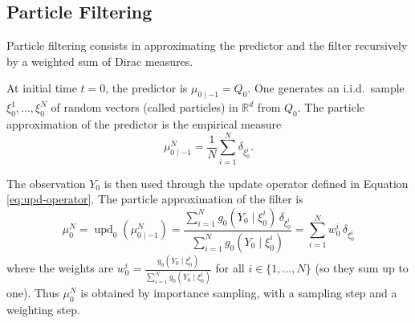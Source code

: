\documentclass{article}
\newcommand{\R}{\mathbb R}
\DeclareMathOperator{\upd}{upd}
\begin{document}
\subsection{Particle Filtering}

Particle filtering consists in approximating the predictor and the filter recursively by a weighted sum of Dirac measures.

At initial time $t=0$, the predictor is $\mu_{0 \mid -1} = Q_0$. One generates an i.i.d.\ sample $\xi^1_0,\dots,\xi^N_0$ of random vectors (called particles) in $\R^d$ from $Q_0$. The particle approximation of the predictor is the empirical measure
\begin{equation*}
    \mu^N_{0 \mid -1} = \frac 1N \sum_{i=1}^N \delta_{\xi^i_0}.
\end{equation*}

The observation $Y_0$ is then used through the update operator defined in Equation \eqref{eq:upd-operator}. The particle approximation of the filter is
\begin{equation*}
    \mu^N_0 = \upd_0(\mu^N_{0 \mid -1}) = \frac{\sum_{i=1}^N g_0(Y_0 \mid \xi^i_0) \, \delta_{\xi^i_0}}{\sum_{i=1}^N g_0(Y_0 \mid \xi^i_0)} = \sum_{i=1}^N w^i_0 \, \delta_{\xi^i_0}
\end{equation*}
where the weights are $\displaystyle w^i_0 = \frac{g_0(Y_0 \mid \xi^i_0)}{\sum_{i=1}^N g_0(Y_0 \mid \xi^i_0)}$ for all $i \in \{1,\dots,N\}$ (so they sum up to one). Thus $\mu^N_0$ is obtained by importance sampling, with a sampling step and a weighting step.
\end{document}
